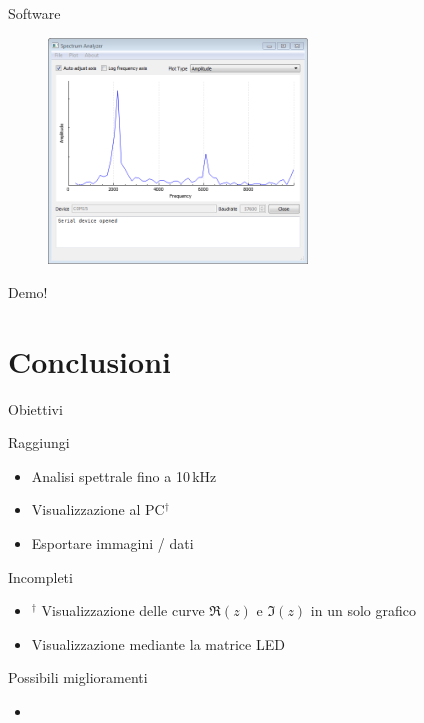 \documentclass[10pt, xetex]{beamer}
\begin{document}
\begin{frame}{Software}
    \begin{figure} \centering
        \includegraphics[height=6cm]{figures/screenshots/desktop-windows7-square}
    \end{figure}
    \begin{center}
        \LARGE Demo!
    \end{center}
\end{frame}

\section{Conclusioni}
\begin{frame}{Obiettivi}
    \begin{block}{Raggiungi}
    \begin{itemize}
        \item Analisi spettrale fino a 10\,kHz
        \item Visualizzazione al PC\(^\dagger\)
        \item Esportare immagini / dati
    \end{itemize}
    \end{block}
    \pause

    \begin{block}{Incompleti}
    \begin{itemize}
        \item \(^\dagger\) Visualizzazione delle curve \(\Re(z)\) e \(\Im(z)\) in un solo grafico
        \item Visualizzazione mediante la matrice LED
    \end{itemize}
    \end{block}
\end{frame}

\begin{frame}{Possibili miglioramenti}
    \begin{itemize}
        \item 
    \end{itemize}
\end{frame}

 
\end{document}
